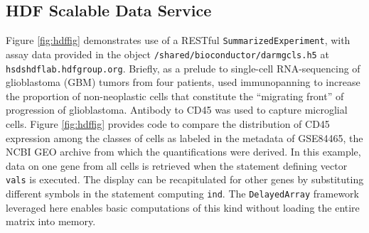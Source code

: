 \documentclass[9pt,a4paper,]{extarticle}
\newenvironment{Shaded}{\begin{snugshade}}{\end{snugshade}}
\newcommand{\KeywordTok}[1]{\textcolor[rgb]{0.13,0.29,0.53}{\textbf{#1}}}
\newcommand{\DataTypeTok}[1]{\textcolor[rgb]{0.13,0.29,0.53}{#1}}
\newcommand{\DecValTok}[1]{\textcolor[rgb]{0.00,0.00,0.81}{#1}}
\newcommand{\StringTok}[1]{\textcolor[rgb]{0.31,0.60,0.02}{#1}}
\newcommand{\OperatorTok}[1]{\textcolor[rgb]{0.81,0.36,0.00}{\textbf{#1}}}
\newcommand{\NormalTok}[1]{#1}
\begin{document}
\subsection{HDF Scalable Data Service}\label{hdf-scalable-data-service}

Figure \ref{fig:hdffig}
demonstrates use of a RESTful \texttt{SummarizedExperiment},
with assay data provided
in the object \texttt{/shared/bioconductor/darmgcls.h5}
at \texttt{hsdshdflab.hdfgroup.org}. Briefly, as a
prelude to single-cell RNA-sequencing of glioblastoma (GBM)
tumors from four patients,
\citet{Darmanis2017} used immunopanning to increase the
proportion of non-neoplastic cells that constitute
the ``migrating front'' of progression of glioblastoma.
Antibody to CD45 was used to capture microglial cells.
Figure \ref{fig:hdffig} provides code to compare
the distribution of CD45 expression among the
classes of
cells as labeled in the metadata of GSE84465,
the NCBI GEO archive from which the quantifications
were derived. In this example, data on one
gene from all cells
is retrieved when the statement defining vector \texttt{vals}
is executed. The display can be recapitulated for
other genes by substituting different symbols in
the statement computing \texttt{ind}.
The \texttt{DelayedArray} framework leveraged here
enables basic computations of this kind without loading the
entire matrix into memory.

\begin{Shaded}
\end{Shaded}
\end{document}
